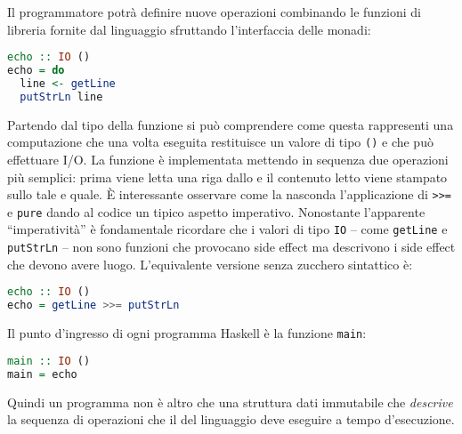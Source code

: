 Il programmatore potrà definire nuove operazioni combinando le funzioni di libreria fornite dal linguaggio sfruttando l'interfaccia delle monadi:
\begin{lstlisting}[language=haskell]
echo :: IO ()
echo = do
  line <- getLine
  putStrLn line
\end{lstlisting}
Partendo dal tipo della funzione si può comprendere come questa rappresenti una computazione che una volta eseguita restituisce un valore di tipo \lstinline{()} e che può effettuare I/O. La funzione è implementata mettendo in sequenza due operazioni più semplici: prima viene letta una riga dallo  e il contenuto letto viene stampato sullo  tale e quale.
È interessante osservare come la  nasconda l'applicazione di \lstinline{>>=} e \lstinline{pure} dando al codice un tipico aspetto imperativo. Nonostante l'apparente ``imperatività'' è fondamentale ricordare che i valori di tipo \lstinline{IO} -- come \lstinline{getLine} e \lstinline{putStrLn} -- non sono funzioni che provocano side effect ma descrivono i side effect che devono avere luogo. L'equivalente versione senza zucchero sintattico è:
\begin{lstlisting}[language=haskell]
echo :: IO ()
echo = getLine >>= putStrLn
\end{lstlisting}

Il punto d'ingresso di ogni programma Haskell è la funzione \lstinline{main}:
\begin{lstlisting}[language=haskell]
main :: IO ()
main = echo
\end{lstlisting}
Quindi un programma non è altro che una struttura dati immutabile che \emph{descrive} la sequenza di operazioni che il  del linguaggio deve eseguire a tempo d'esecuzione.

